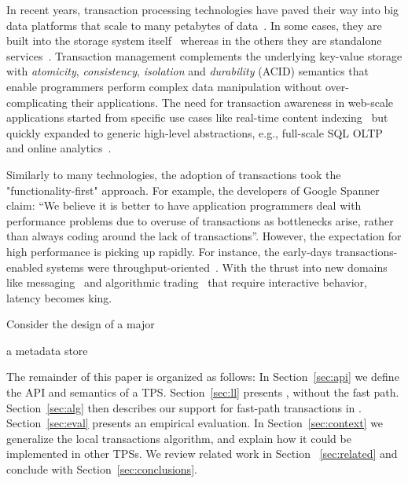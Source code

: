 In recent years, transaction processing technologies have paved their way into big data 
platforms that scale to many petabytes of data~\cite{Spanner2012,Percolator2010,Omid2017}. 
In some cases, they are built into the storage system itself~\cite{Spanner2012} whereas in the 
others they are standalone services~\cite{Omid2017}. Transaction management complements 
the underlying key-value storage with {\em atomicity}, {\em consistency}, {\em isolation\/} and 
{\em durability} (ACID) semantics that enable programmers perform complex data manipulation 
without over-complicating their applications. The need for transaction awareness in web-scale 
applications started from specific use cases like real-time content indexing~\cite{Percolator2010,Omid2017} 
but quickly expanded to generic high-level abstractions, e.g., full-scale SQL OLTP and 
online analytics~\cite{Phoenix, F1-2013}.

Similarly to many technologies, the adoption of transactions took the "functionality-first" approach. 
For example, the developers of Google Spanner~\cite{Spanner2012} claim: ``We believe it
is better to have application programmers deal with performance problems due to overuse 
of transactions as bottlenecks arise, rather than always coding around the lack of transactions''. 
However, the expectation for high performance is picking up rapidly. For instance, the early-days  
transactions-enabled systems were throughput-oriented~\cite{Percolator2010,Omid2017}. 
With the thrust into new domains like messaging~\cite{Borthakur:2011} and algorithmic 
trading~\cite{opentsdb} that require interactive behavior, latency becomes king. 

Consider the design of a major 

a metadata store 

The remainder of this paper is organized as follows:
In Section~\ref{sec:api} we define the  API and semantics of a TPS. 
Section~\ref{sec:ll} presents \sys, without the fast path. 
Section~\ref{sec:alg} then describes our support for fast-path  transactions in \sys.  
Section~\ref{sec:eval} presents an empirical evaluation.
In Section~\ref{sec:context} we generalize the local transactions algorithm, and explain how it could be implemented in 
other TPSs. 
 We review related work in Section ~\ref{sec:related} and conclude with Section~\ref{sec:conclusions}.
